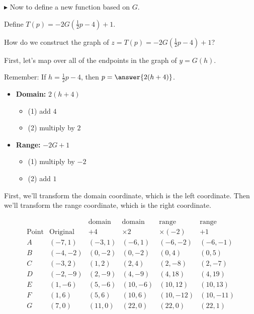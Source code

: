 \documentclass{ximera}
\begin{document}
\begin{example}
$\blacktriangleright$ Now to define a new function based on  $G$.






Define  $T(p) = -2G\left( \frac{1}{2} p - 4 \right) + 1$.


How do we construct the graph of $z = T(p) = -2G\left(\frac{1}{2} p - 4\right) + 1$?

First, let's map over all of the endpoints in the graph of $y = G(h)$.

Remember: If  $h = \frac{1}{2} p - 4$, then $p = \answer{2(h+4)}$.

\begin{itemize}
 \item \textbf{Domain:}  $2 (h+4)$ 
    \begin{itemize}
      \item (1) add $4$
      \item (2) multiply by $2$
    \end{itemize}

 \item \textbf{Range:}  $-2 G + 1$ 
    \begin{itemize}
      \item (1) multiply by $-2$
      \item (2) add $1$
    \end{itemize}
\end{itemize}


First, we'll transform the domain coordinate, which is the left coordinate.  Then we'll transform the range coordinate, which is the right coordinate.

\[
\begin{array}{c|l|l|l|l|l}
        &         &  \text{domain}  &  \text{domain}    &  \text{range}   & \text{range}         \\
\text{Point}    &  \text{Original}  &  +4           &  \times2   &  \times(-2)  & + 1          \\
\hline
A   &   (-7, 1)          &  (-3, 1)      &  (-6, 1)     &  (-6, -2)    &  (-6,-1)     \\
B   &   (-4, -2)         &  (0, -2)      &  (0, -2)     &  (0,4)      &  (0,5)       \\
C   &   (-3,2)           &  (1,2)        &  (2,4)       &  (2,-8)     &  (2,-7)     \\
D   &   (-2,-9)          &  (2, -9)      &  (4,-9)      &  (4, 18)    &  (4,19)      \\
E   &   (1,-6)           &  (5,-6)       &  (10,-6)     &  (10,12)    &  (10,13)     \\
F   &   (1,6)            &  (5, 6)       &  (10,6)      &  (10,-12)   &  (10,-11)   \\
G   &   (7,0)            &  (11,0)       &  (22,0)      &  (22,0)     &  (22,1)
\end{array}
\]





\end{example}
\end{document}
